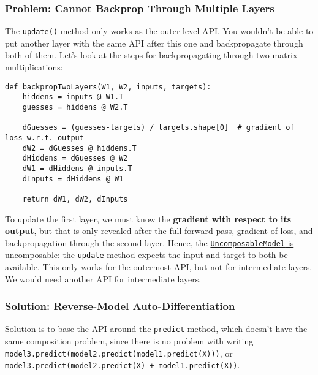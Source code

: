 \documentclass[
]{article}
\begin{document}
\hypertarget{problem-cannot-backprop-through-multiple-layers}{%
\subsubsection{Problem: Cannot Backprop Through Multiple
Layers}\label{problem-cannot-backprop-through-multiple-layers}}

The \texttt{update()} method only works as the outer-level
API. You wouldn't be able to put another layer with the same API after
this one and backpropagate through both of them. Let's look at the steps
for backpropagating through two matrix multiplications:

\begin{verbatim}
def backpropTwoLayers(W1, W2, inputs, targets):
    hiddens = inputs @ W1.T
    guesses = hiddens @ W2.T

    dGuesses = (guesses-targets) / targets.shape[0]  # gradient of loss w.r.t. output
    dW2 = dGuesses @ hiddens.T
    dHiddens = dGuesses @ W2
    dW1 = dHiddens @ inputs.T
    dInputs = dHiddens @ W1

    return dW1, dW2, dInputs
\end{verbatim}

To update the first layer, we must know the \textbf{gradient with
respect to its output}, but that is only revealed after the full forward
pass, gradient of loss, and backpropagation through the second layer.
Hence, the
\href{https://hyp.is/cL4BsnvxEeqOtAf6xyOeLw/thinc.ai/docs/concept}{\texttt{UncomposableModel}
is uncomposable}: the \texttt{update} method expects the
input and target to both be available. This only works for the outermost
API, but not for intermediate layers. We would need another API for
intermediate layers.

\hypertarget{solution-reverse-model-auto-differentiation}{%
\subsubsection{Solution: Reverse-Model
Auto-Differentiation}\label{solution-reverse-model-auto-differentiation}}

\href{https://hyp.is/ftIl0HvxEeqgBZeOXtiyiw/thinc.ai/docs/concept}{Solution
is to base the API around the \texttt{predict} method},
which doesn't have the same composition problem, since there is no
problem with writing
\texttt{model3.predict(model2.predict(model1.predict(X)))},
or
\texttt{model3.predict(model2.predict(X) + model1.predict(X))}.
\end{document}
